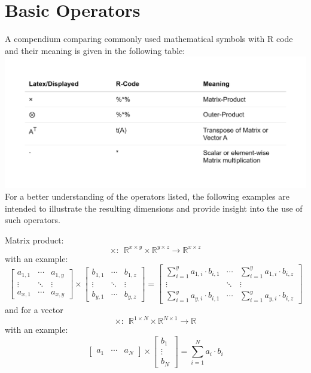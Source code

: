 \documentclass[
  oneside]{book}
\begin{document}
\hypertarget{basic-operators}{%
\section{Basic Operators}\label{basic-operators}}

A compendium comparing commonly used mathematical symbols with R code and their meaning is given in the following table:\\
\includegraphics{Master_Thesis_files/figure-latex/operators-1.png}
For a better understanding of the operators listed, the following examples are intended to illustrate the resulting dimensions and provide insight into the use of such operators.

Matrix product:
\[\times: \ \ \mathbb{R}^{x \times y} \times \mathbb{R}^{y \times z} \rightarrow \mathbb{R}^{x \times z} \]
with an example:
\[ 
\begin{bmatrix}a_{1,1} &\cdots  & a_{1,y} \\ \vdots & \ddots & \vdots  \\ a_{x,1} & \cdots & a_{x,y} \end{bmatrix}
\times
\begin{bmatrix}b_{1,1} &\cdots  & b_{1,z} \\ \vdots & \ddots & \vdots  \\ b_{y,1} & \cdots & b_{y,z} \end{bmatrix}
=
\begin{bmatrix} \sum_{i=1}^y a_{1, i} \cdot  b_{i,1} &\cdots  & \sum_{i=1}^y a_{1, i} \cdot  b_{i,z} \\ \vdots & \ddots & \vdots  \\ \sum_{i=1}^y a_{y, i} \cdot  b_{i,1}  & \cdots & \sum_{i=1}^y a_{y, i} \cdot  b_{i,z} \end{bmatrix}
\]
and for a vector
\[\times: \ \ \mathbb{R}^{1 \times N} \times \mathbb{R}^{N \times 1} \rightarrow \mathbb{R}\]
with an example:
\[
\begin{bmatrix}a_{1} &\cdots  &  a_{N}\end{bmatrix}
\times
\begin{bmatrix}b_{1}\\ \vdots \\  b_{N}\end{bmatrix}
=
\sum_{i=1}^N a_i \cdot  b_i
\]
\end{document}
